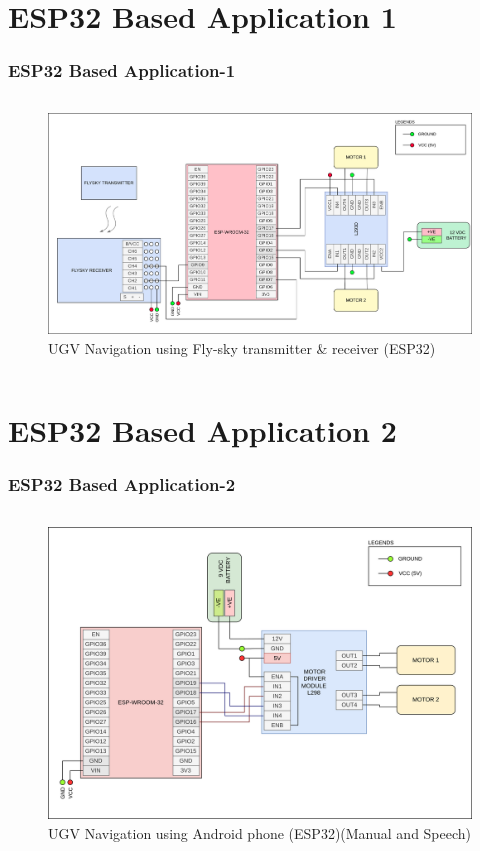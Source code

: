 \documentclass{beamer}
\begin{document}
\section{ESP32 Based Application 1}
\begin{frame}
\frametitle{ESP32 Based Application-1}
\begin{columns}
	\begin{figure}[h!]
  		\centering
  		\includegraphics[width=\linewidth]{./figs/Wiring_UGV_flysky.png}
  		\caption{UGV Navigation using Fly-sky transmitter \& receiver (ESP32)}
  		\label{Wiring_UGV_flysky}
	\end{figure}
\end{columns}
\end{frame}

\section{ESP32 Based Application 2}
\begin{frame}
\frametitle{ESP32 Based Application-2}
\begin{columns}
	\begin{figure}[h!]
  		\centering
  		\includegraphics[width=\linewidth]{./figs/Wiring_UGV_speech.png}
  		\caption{UGV Navigation using Android phone (ESP32)(Manual and Speech)}
  		\label{Wiring_UGV_speech}
	\end{figure}
\end{columns}
\end{frame}
\end{document}
